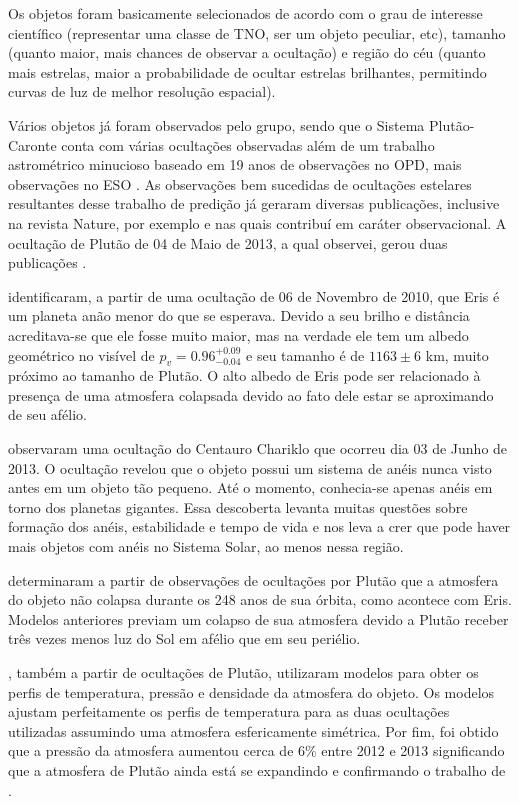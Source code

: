 \documentclass[12pt,a4paper]{report}
\begin{document}
Os objetos foram basicamente selecionados de acordo com o grau de interesse científico (representar uma classe de TNO, ser um  objeto peculiar, etc), tamanho (quanto maior, mais chances de observar a ocultação) e região do céu (quanto mais estrelas, maior  a probabilidade de ocultar estrelas brilhantes, permitindo curvas de luz de melhor resolução espacial).

Vários objetos já foram observados pelo grupo, sendo que o Sistema Plutão-Caronte conta com várias ocultações observadas além de um trabalho astrométrico minucioso baseado em 19 anos de observações no OPD, mais observações no ESO \citep{Rossi2014}. As observações bem sucedidas de ocultações estelares resultantes desse trabalho de predição já geraram diversas publicações, inclusive na revista Nature, por exemplo \cite{Sicardy2011} e \cite{BragaRibas2014} nas quais contribuí em caráter observacional. A ocultação de Plutão de 04 de Maio de 2013, a qual observei, gerou duas publicações \citep{Olkin2015, DiasOliveira2015}.

\cite{Sicardy2011} identificaram, a partir de uma ocultação de 06 de Novembro de 2010, que Eris é um planeta anão menor do que se esperava. Devido a seu brilho e distância acreditava-se que ele fosse muito maior, mas na verdade ele tem um albedo geométrico no visível de $p_v=0.96^{+0.09}_{-0.04}$ e seu tamanho é de $1163 \pm 6$ km, muito próximo ao tamanho de Plutão. O alto albedo de Eris pode ser relacionado à presença de uma atmosfera colapsada devido ao fato dele estar se aproximando de seu afélio.

\cite{BragaRibas2014} observaram uma ocultação do Centauro Chariklo que ocorreu dia 03 de Junho de 2013. O ocultação revelou que o objeto possui um sistema de anéis nunca visto antes em um objeto tão pequeno. Até o momento, conhecia-se apenas anéis em torno dos planetas gigantes. Essa descoberta levanta muitas questões sobre formação dos anéis, estabilidade e tempo de vida e nos leva a crer que pode haver mais objetos com anéis no Sistema Solar, ao menos nessa região.

\cite{Olkin2015} determinaram a partir de observações de ocultações por Plutão que a atmosfera do objeto não colapsa durante os 248 anos de sua órbita, como acontece com Eris. Modelos anteriores previam um colapso de sua atmosfera devido a Plutão receber três vezes menos luz do Sol em afélio que em seu periélio.

\cite{DiasOliveira2015}, também a partir de ocultações de Plutão, utilizaram modelos para obter os perfis de temperatura, pressão e densidade da atmosfera do objeto. Os modelos ajustam perfeitamente os perfis de temperatura para as duas ocultações utilizadas assumindo uma atmosfera esfericamente simétrica. Por fim, foi obtido que a pressão da atmosfera aumentou cerca de 6\% entre 2012 e 2013 significando que a atmosfera de Plutão ainda está se expandindo e confirmando o trabalho de \cite{Olkin2015}.
\end{document}
